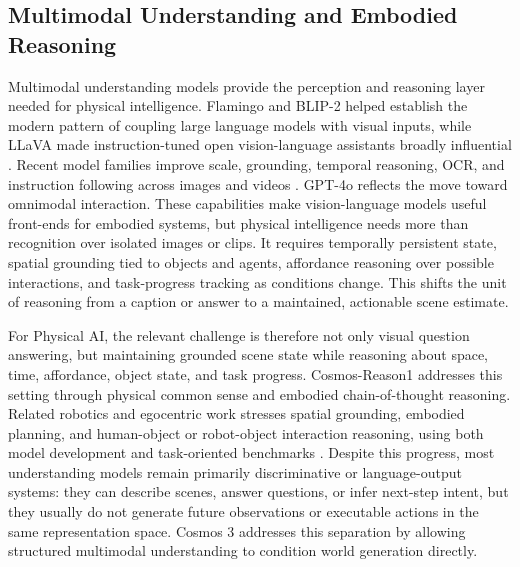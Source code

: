 \documentclass{llmxive}
\begin{document}
\subsection{Multimodal Understanding and Embodied Reasoning}
Multimodal understanding models provide the perception and reasoning layer needed for physical intelligence.
Flamingo \citep{alayrac2022flamingo} and BLIP-2 \citep{li2023blip2} helped establish the modern pattern of coupling large language models with visual inputs, while LLaVA \citep{liu2023visual,llavaonevision} made instruction-tuned open vision-language assistants broadly influential \citep{zhu2023minigpt4}.
Recent model families improve scale, grounding, temporal reasoning, OCR, and instruction following across images and videos \citep{chen2024internvl,wang2025internvl35,dai2024nvlm,bai2023qwen,qwen3vl2025,qwen2p5vl,deitke2024molmo,kosmos2,you2024ferret,zhang2024ferret,mm1,zhang2025mm1,tschannen2025siglip,xiao2024unified,beyer2024versatile,steiner2024family}.
GPT-4o \citep{openai2024gpt4o} reflects the move toward omnimodal interaction.
These capabilities make vision-language models useful front-ends for embodied systems, but physical intelligence needs more than recognition over isolated images or clips.
It requires temporally persistent state, spatial grounding tied to objects and agents, affordance reasoning over possible interactions, and task-progress tracking as conditions change.
This shifts the unit of reasoning from a caption or answer to a maintained, actionable scene estimate.

For Physical AI, the relevant challenge is therefore not only visual question answering, but maintaining grounded scene state while reasoning about space, time, affordance, object state, and task progress.
Cosmos-Reason1 \citep{azzolini2025cosmos} addresses this setting through physical common sense and embodied chain-of-thought reasoning.
Related robotics and egocentric work stresses spatial grounding, embodied planning, and human-object or robot-object interaction reasoning, using both model development and task-oriented benchmarks \citep{sermanet2024robovqa,HoloAssist2023,chen2025robo2vlm,yang2025magma,chen2024spatialvlm,song2025robospatial,zhou2025roborefer,yang2025embodiedbench}.
Despite this progress, most understanding models remain primarily discriminative or language-output systems: they can describe scenes, answer questions, or infer next-step intent, but they usually do not generate future observations or executable actions in the same representation space.
Cosmos 3 addresses this separation by allowing structured multimodal understanding to condition world generation directly.
\end{document}
